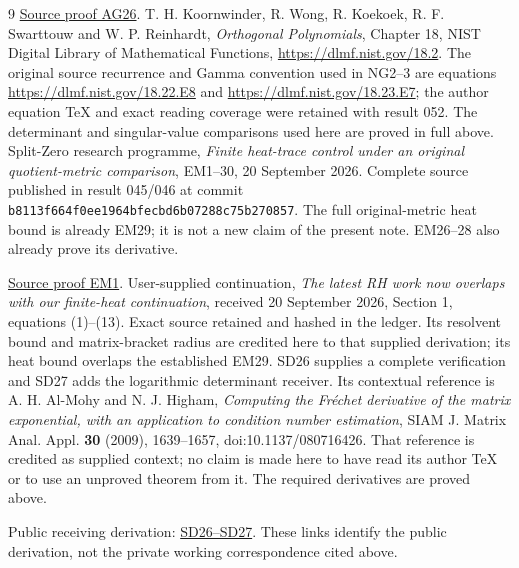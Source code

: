 \documentclass[11pt]{article}
\begin{document}
\begin{thebibliography}{9}
\href{https://github.com/KokunoYumeto/zeta-function-research-reader/blob/5992ad50c0f2a06921f1fcaded7b4e38097c0739/workbenches/splitzero-tandem/continuations/20260920-original-kernel-mixed-determinants/providers/ABSOLUTE_GAMMA_AND_ACTION.tex\#L358}{Source proof AG26}.
 T. H. Koornwinder, R. Wong, R. Koekoek,
R. F. Swarttouw and W. P. Reinhardt, \emph{Orthogonal Polynomials},
Chapter 18, NIST Digital Library of Mathematical Functions,
\url{https://dlmf.nist.gov/18.2}. The original source recurrence and
Gamma convention used in NG2--3 are equations
\url{https://dlmf.nist.gov/18.22.E8} and
\url{https://dlmf.nist.gov/18.23.E7}; the author equation TeX and exact
reading coverage were retained with result 052. The determinant and
singular-value comparisons used here are proved in full above.
 Split-Zero research programme, \emph{Finite heat-trace
control under an original quotient-metric comparison}, EM1--30,
20 September 2026. Complete source published in result 045/046 at
commit \nolinkurl{b8113f664f0ee1964bfecbd6b07288c75b270857}.
The full original-metric heat bound is already EM29; it is not a new
claim of the present note. EM26--28 also already prove its derivative.

\href{https://github.com/KokunoYumeto/zeta-function-research-reader/blob/5992ad50c0f2a06921f1fcaded7b4e38097c0739/workbenches/splitzero-tandem/continuations/20260920-original-kernel-mixed-determinants/providers/ENDPOINT_METRIC_HEAT.tex\#L38}{Source proof EM1}.
 User-supplied continuation, \emph{The latest RH
work now overlaps with our finite-heat continuation}, received
20 September 2026, Section 1, equations (1)--(13). Exact source retained
and hashed in the ledger. Its resolvent bound and matrix-bracket radius
are credited here to that supplied derivation; its heat bound overlaps
the established EM29. SD26 supplies a complete verification and SD27 adds the logarithmic
determinant receiver. Its contextual reference is A. H. Al-Mohy and
N. J. Higham, \emph{Computing the Fr\'echet derivative of the matrix
exponential, with an application to condition number estimation},
SIAM J. Matrix Anal. Appl. \textbf{30} (2009), 1639--1657,
doi:10.1137/080716426. That reference is credited as supplied context;
no claim is made here to have read its author TeX or to use an unproved
theorem from it. The required derivatives are proved above.

Public receiving derivation: \href{https://github.com/KokunoYumeto/zeta-function-research-reader/blob/689a8f87e9c12b7a99b01b3123438c6751ee608f/workbenches/splitzero-tandem/continuations/20260920-original-spectral-determinant/ORIGINAL_SPECTRAL_DETERMINANT.tex\#L471}{SD26--SD27}. These links identify the public derivation, not the private working correspondence cited above.
\end{thebibliography}
\end{document}
